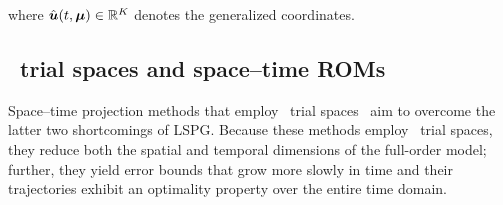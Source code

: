 \documentclass[3p,computermodern,10pt]{elsarticle}
\begin{document}
where $\hat{\boldsymbol u}(t,\boldsymbol \mu) \in \mathbb{R}^{K}$ denotes the generalized
coordinates. 

\subsection{\spaceTimeAcronym\ trial spaces and space--time ROMs}
Space--time projection methods that employ \spaceTimeAcronym\ trial
spaces~\cite{choi_stlspg,constantine_strom,URBAN2012203,Yano2014ASC,benner_st,bui_thesis}
aim to overcome the latter two shortcomings of LSPG. Because these methods employ \spaceTimeAcronym\ trial
spaces, they reduce both the spatial and temporal dimensions of the full-order
model; further, they yield error bounds that grow more slowly in time and
their trajectories exhibit an optimality property over the entire time domain. 
\end{document}
